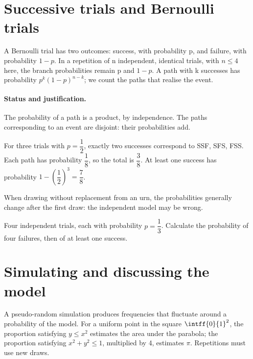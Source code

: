 \section{Successive trials and Bernoulli trials}\label{C05-U4}
\begin{keypoint}
A Bernoulli trial has two outcomes: success, with probability p, and failure, with probability $1-p$. In a repetition of n independent, identical trials, with $n\leq4$ here, the branch probabilities remain p and $1-p$. A path with k successes has probability $p^k(1-p)^{n-k}$; we count the paths that realise the event.
\end{keypoint}
\paragraph{Status and justification.} The probability of a path is a product, by independence. The paths corresponding to an event are disjoint: their probabilities add.
\begin{example}For three trials with $p=\dfrac{1}{2}$, exactly two successes correspond to SSF, SFS, FSS. Each path has probability $\dfrac{1}{8}$, so the total is $\dfrac{3}{8}$. At least one success has probability $1-(\dfrac{1}{2})^3=\dfrac{7}{8}$.\end{example}\label{C05-EX4}
\begin{pitfall}When drawing without replacement from an urn, the probabilities generally change after the first draw: the independent model may be wrong.\end{pitfall}
\begin{application}Four independent trials, each with probability $p=\dfrac{1}{3}$. Calculate the probability of four failures, then of at least one success.\end{application}\label{C05-AP4}
\section{Simulating and discussing the model}\label{C05-U5}
\begin{keypoint}
A pseudo-random simulation produces frequencies that fluctuate around a probability of the model. For a uniform point in the square $\intff{0}{1}^2$, the proportion satisfying $y\leq x^2$ estimates the area under the parabola; the proportion satisfying $x^2+y^2\leq1$, multiplied by 4, estimates $\pi$. Repetitions must use new draws.
\end{keypoint}

